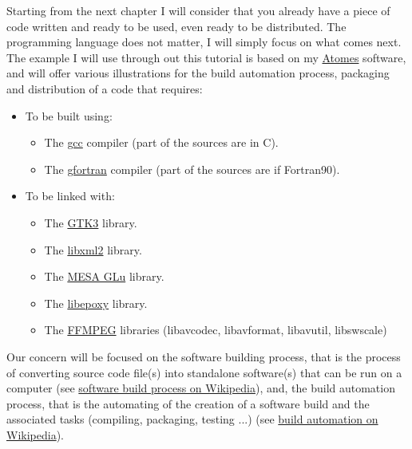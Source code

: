\documentclass{./these-seb}
\begin{document}
Starting from the next chapter I will consider that you already have a piece of code written and ready to be used, even ready to be distributed. 
The programming language does not matter, I will simply focus on what comes next. \\[0.25cm]
The example I will use through out this tutorial is based on my \href{https://atomes.ipcms.fr}{Atomes} software, 
and will offer various illustrations for the build automation process, packaging and distribution of a code that requires: 
\begin{itemize}
\item To be built using:
\begin{itemize}
\item The \href{https://www.gnu.org/software/gcc/}{gcc} compiler (part of the sources are in C).
\item The \href{https://gcc.gnu.org/wiki/GFortran}{gfortran} compiler (part of the sources are if Fortran90).
\end{itemize}
\item To be linked with:
\begin{itemize}
\item The \href{https://www.gtk.org/}{GTK3} library.
\item The \href{http://xmlsoft.org/}{libxml2} library.
\item The \href{https://gitlab.freedesktop.org/mesa/glu}{MESA GLu} library.
\item The \href{https://github.com/anholt/libepoxy}{libepoxy} library.
\item The \href{https://ffmpeg.org}{FFMPEG} libraries (libavcodec, libavformat, libavutil, libswscale)
\end{itemize}
\end{itemize}
\vspace{0.25cm}
\noindent Our concern will be focused on the software building process, that is the process of converting source code file(s) into standalone software(s) 
that can be run on a computer (see \href{https://en.wikipedia.org/wiki/Software\_build}{software build process on Wikipedia}), and, 
the build automation process, that is the automating of the creation of a software build and the associated tasks (compiling, packaging, testing ...) (see \href{https://en.wikipedia.org/wiki/Build\_automation}{build automation on Wikipedia}).  






\appendix
\end{document}
